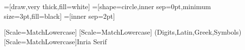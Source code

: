 


\usepackage{etex} %


\usepackage[english]{babel}

\usepackage{cmap}
\usepackage{graphicx}
\usepackage{color,colortbl,spot}
\usepackage{pgfplots}




\usepackage{hyperref}
\usepackage{appendixnumberbeamer}

\usepackage{booktabs} %
\usepackage{subcaption}
\usepackage{comment}


\usepackage{amsmath}
\usepackage{amssymb}


\usepackage{multicol}
\usepackage{multirow}
\usepackage{array} %



\usepackage[absolute,overlay]{textpos}
\usepackage{overpic}
\usepackage{tikz}
\usetikzlibrary{decorations.pathreplacing}
\usetikzlibrary{arrows}
\usetikzlibrary{arrows.meta}
\usetikzlibrary{patterns}
\usetikzlibrary{shapes}
\usetikzlibrary{shadows}
\usetikzlibrary{calc}
\usetikzlibrary{math}
=[draw,very thick,fill=white]
=[shape=circle,inner sep=0pt,minimum size=3pt,fill=black]
=[inner sep=2pt]







\usepackage{mathspec}
\setmainfont{Inria Serif}[Scale=MatchLowercase]
\setsansfont{Inria Sans}[Scale=MatchLowercase]
\setmathfont(Digits,Latin,Greek,Symbols)[Scale=MatchLowercase]{Inria Serif}





